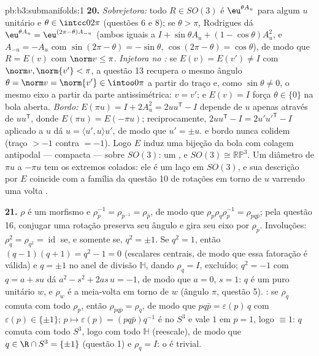 \begin{solution}{pb:b3:submanifolds:1}
\textbf{20.} \emph{Sobrejetora:} todo $R \in SO(3)$ é
$\eu^{\theta A_u}$ para algum $u$ unitário e $\theta \in
\intcc0{2\pi}$ (questões 6 e 8); se $\theta > \pi$,
Rodrigues dá $\eu^{\theta A_u} = \eu^{(2\pi -
\theta)A_{-u}}$ (ambos iguais a $I + \sin\theta A_u + (1 -
\cos\theta)A_u^2$, e $A_{-u} = -A_u$ com $\sin(2\pi -
\theta) = -\sin\theta$, $\cos(2\pi - \theta) =
\cos\theta$), de modo que $R = E(v)$ com $\norm v \leq \pi$.
\emph{Injetora no :} se $E(v) = E(v') \neq I$ com
$\norm v, \norm{v'} < \pi$, a questão 13 recupera o mesmo
ângulo $\theta = \norm v = \norm{v'} \in \intoo0\pi$ a partir
do traço e, como $\sin\theta \neq 0$, o mesmo eixo
a partir da parte antissimétrica: $v = v'$; e $E(v) = I$
força $\theta \in \{0\}$ na bola aberta. \emph{Bordo:}
$E(\pi u) = I + 2A_u^2 = 2uu^{\mathsf T} - I$ depende de
$u$ apenas através de $uu^{\mathsf T}$, donde $E(\pi u) =
E(-\pi u)$; reciprocamente, $2uu^{\mathsf T} - I =
2u'u'^{\mathsf T} - I$ aplicado a $u$ dá $u = \langle
u', u\rangle u'$, de modo que $u' = \pm u$.  e bordo
nunca colidem (traço $> -1$ contra $= -1$). Logo $E$ induz
uma bijeção  da bola com colagem antipodal
--- compacta --- sobre $SO(3)$: um , e $SO(3)
\cong \mathbb{RP}^3$. Um diâmetro de $\pi u$ a $-\pi u$
tem os extremos colados: ele é um laço em $SO(3)$, e sua
descrição por $E$ coincide com a família da questão 10 de rotações
em torno de $u$ varrendo uma volta .

\textbf{21.} $\rho$ é um morfismo e $\rho_p^{-1} =
\rho_{p^{-1}} = \rho_{\bar p}$, de modo que $\rho_p\rho_q\rho_p^{-1}
= \rho_{pq\bar p}$; pela questão 16, conjugar uma rotação
preserva seu ângulo e gira seu eixo por $\rho_p$.
Involuções: $\rho_q^2 = \rho_{q^2} = \operatorname{id}$
se, e somente se, $q^2 = \pm1$. Se $q^2 = 1$, então $(q - 1)(q + 1) = q^2 -
1 = 0$ (escalares centrais, de modo que essa fatoração é válida) e
$q = \pm1$ no anel de divisão $\mathbb H$, dando $\rho_q
= I$, excluído; $q^2 = -1$ com $q = a +
su$ dá $a^2 - s^2 + 2as\,u = -1$, de modo que $a = 0$, $s = 1$:
$q$ é um puro unitário $w$, e $\rho_w$ é a meia-volta em torno de
$w$ (ângulo $\pi$, questão 5). : se $\rho_q$ comuta
com todo $\rho_p$, então $\rho_{pq\bar p} = \rho_q$, de modo que
$pq\bar p = \varepsilon(p)\,q$ com $\varepsilon(p) \in
\{\pm1\}$; $p \mapsto \varepsilon(p) = (pq\bar p)q^{-1}$ é
 no  $S^3$ e vale $1$ em $p =
1$, logo $\equiv 1$: $q$ comuta com todo $S^3$, logo
com todo $\mathbb H$ (reescale), de modo que $q \in \R \cap S^3 =
\{\pm1\}$ (questão 1) e $\rho_q = I$: o  é
trivial.


\end{solution}
